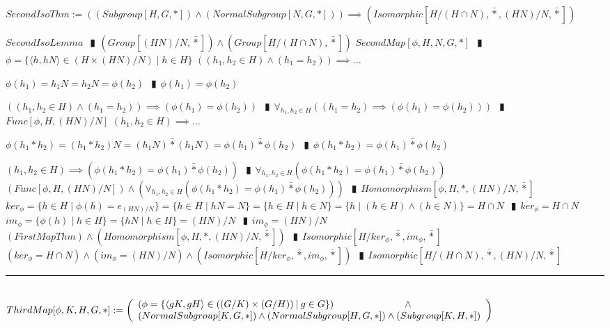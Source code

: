 \documentclass{book}
\newcommand{\abr}{:=}
\newcommand{\pipe}{$\phantom{(}\vrectangleblack\phantom{)}$}
\newcommand{\pr}[1]{\left(#1\right)}
\newcommand{\bbin}[1]{\mathbin{{\bar{#1}}}}
\newcommand{\st}{\mathbin{|}}
\begin{document}
$SecondIsoThm \abr \pr{(Subgroup[H, G, *]) \land (NormalSubgroup[N, G, *])} \implies \pr{Isomorphic[H / (H \cap N), \bbin{*}, (H N) / N, \bbin{*}]}$
\begin{enumerate}
  \lit $SecondIsoLemma$ \pipe $\pr{Group[(H N) / N, \bbin{*}]} \land \pr{Group[H / (H \cap N), \bbin{*}]}$
  \lit $SecondMap[\phi, H, N, G, *]$ \pipe $\phi = \{\langle h, h N \rangle \in \pr{H \times (H N) / N} \st h \in H\}$
  \lit $\pr{(h_1, h_2 \in H) \land (h_1 = h_2)} \implies \ldots$
  \begin{enumerate}
    \lit $\phi(h_1) = h_1 N = h_2 N = \phi(h_2)$ \pipe $\phi(h_1) = \phi(h_2)$
  \end{enumerate}
  \lit $\pr{(h_1, h_2 \in H) \land (h_1 = h_2)} \implies \pr{\phi(h_1) = \phi(h_2)}$ \pipe $\forall_{h_1, h_2 \in H}\pr{(h_1 = h_2) \implies \pr{\phi(h_1) = \phi(h_2)}}$ \pipe $Func[\phi, H, (H N) / N]$
  \lit $(h_1, h_2 \in H) \implies \ldots$
  \begin{enumerate}
    \lit $\phi(h_1 * h_2) = (h_1 * h_2) N = (h_1 N) \bbin{*} (h_1 N) = \phi(h_1) \bbin{*} \phi(h_2)$ \pipe $\phi(h_1 * h_2) = \phi(h_1) \bbin{*} \phi(h_2)$  %
  \end{enumerate}
  \lit $(h_1, h_2 \in H) \implies \pr{\phi(h_1 * h_2) = \phi(h_1) \bbin{*} \phi(h_2)}$ \pipe $\forall_{h_1, h_2 \in H}\pr{\phi(h_1 * h_2) = \phi(h_1) \bbin{*} \phi(h_2)}$
  \lit $\pr{Func[\phi, H, (H N) / N]} \land \pr{\forall_{h_1, h_2 \in H}\pr{\phi(h_1 * h_2) = \phi(h_1) \bbin{*} \phi(h_2)}}$ \pipe $Homomorphism[\phi, H, *, (H N) / N, \bbin{*}]$
  \lit $ker_\phi = \{h \in H \st \phi(h) = e_{(H N) / N}\} = \{h \in H \st h N = N\} = \{h \in H \st h \in N\} = \{h \st (h \in H) \land (h \in N)\} = H \cap N$ \pipe $ker_\phi = H \cap N$
  \lit $im_\phi = \{\phi(h) \st h \in H\} = \{h N \st h \in H\} = (H N) / N$ \pipe $im_\phi = (H N) / N$
  \lit $(FirstMapThm) \land \pr{Homomorphism[\phi, H, *, (H N) / N, \bbin{*}]}$ \pipe $Isomorphic[H / ker_\phi, \bbin{*}, im_\phi, \bbin{*}]$
  \lit $(ker_\phi = H \cap N) \land \pr{im_\phi = (H N) / N} \land (Isomorphic[H / ker_\phi, \bbin{*}, im_\phi, \bbin{*}])$ \pipe $Isomorphic[H / (H \cap N), \bbin{*}, (H N) / N, \bbin{*}]$
\end{enumerate} \vspace{.75mm} \hrule \vspace{.75mm} \ \\

$ThirdMap[\phi, K, H, G, *] \abr \left(\begin{array}{ll}
  \pr{\phi = \{\langle g K, g H \rangle \in \pr{(G / K) \times (G / H)} \st g \in G\}} \hfill \land \hfill \\
  (NormalSubgroup[K, G, *]) \hfill \land \hfill (NormalSubgroup[H, G, *]) \hfill \land \hfill (Subgroup[K, H, *])
\end{array}\right)$ \\
\end{document}
